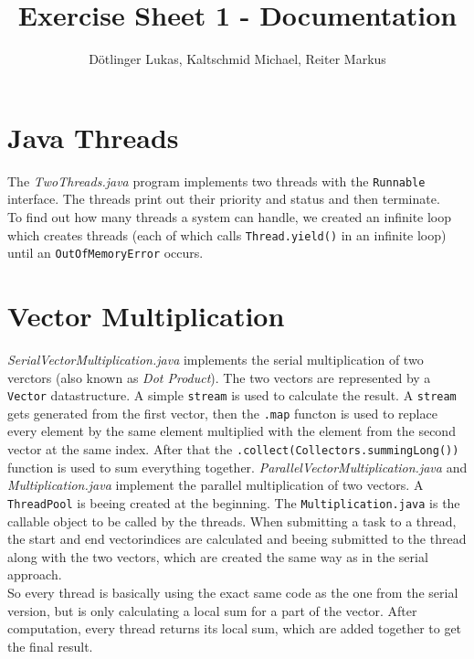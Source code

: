 \documentclass{article}
\begin{document}
	\title{Exercise Sheet 1 - Documentation}
	\date{}
	\author{Dötlinger Lukas, Kaltschmid Michael, Reiter Markus}

	\maketitle


	\section{Java Threads}
	The \textit{TwoThreads.java} program implements two threads with the \texttt{Runnable} interface. The threads print out their priority and status and then terminate.\\
    To find out how many threads a system can handle, we created an infinite loop which creates threads (each of which calls \texttt{Thread.yield()} in an infinite loop) until an \texttt{OutOfMemoryError} occurs.

	\section{Vector Multiplication}
		\textit{SerialVectorMultiplication.java} implements the serial multiplication of two verctors (also known as \textit{Dot Product}). The two vectors are represented by a \texttt{Vector} datastructure. A simple \texttt{stream} is used to calculate the result. A \texttt{stream} gets generated from the first vector, then the \texttt{.map} functon is used to replace every element by the same element multiplied with the element from the second vector at the same index. After that the \texttt{.collect(Collectors.summingLong())} function is used to sum everything together.\bigbreak
		\textit{ParallelVectorMultiplication.java} and \textit{Multiplication.java} implement the parallel multiplication of two vectors. A \texttt{ThreadPool} is beeing created at the beginning. The \texttt{Multiplication.java} is the callable object to be called by the threads. When submitting a task to a thread, the start and end vectorindices are calculated and beeing submitted to the thread along with the two vectors, which are created the same way as in the serial approach.\\ 
		So every thread is basically using the exact same code as the one from the serial version, but is only calculating a local sum for a part of the vector.
		After computation, every thread returns its local sum, which are added together to get the final result.
\end{document}
